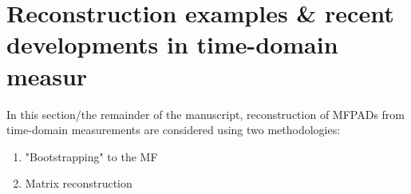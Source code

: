 \section{Reconstruction examples & recent developments in time-domain measur}

In this section/the remainder of the manuscript, reconstruction of MFPADs from time-domain measurements are considered using two methodologies:

\begin{enumerate}
\item "Bootstrapping" to the MF
\item Matrix reconstruction
\end{enumerate}